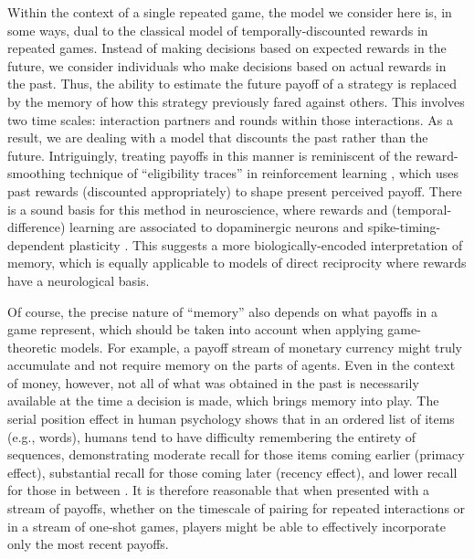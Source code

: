 \documentclass[11pt]{article}
\theoremstyle{plainCl1}
\theoremstyle{plainCl2}
\begin{document}
Within the context of a single repeated game, the model we consider here is, in some ways, dual to the classical model of temporally-discounted rewards in repeated games. Instead of making decisions based on expected rewards in the future, we consider individuals who make decisions based on actual rewards in the past. Thus, the ability to estimate the future payoff of a strategy is replaced by the memory of how this strategy previously fared against others. This involves two time scales: interaction partners and rounds within those interactions. As a result, we are dealing with a model that discounts the past rather than the future. Intriguingly, treating payoffs in this manner is reminiscent of the reward-smoothing technique of ``eligibility traces'' in reinforcement learning \citep{sutton:MIT:2018}, which uses past rewards (discounted appropriately) to shape present perceived payoff. There is a sound basis for this method in neuroscience, where rewards and (temporal-difference) learning are associated to dopaminergic neurons \citep{schultz:JN:1998} and spike-timing-dependent plasticity \citep{dan:Neuron:2004}. This suggests a more biologically-encoded interpretation of memory, which is equally applicable to models of direct reciprocity where rewards have a neurological basis.

Of course, the precise nature of ``memory'' also depends on what payoffs in a game represent, which should be taken into account when applying game-theoretic models. For example, a payoff stream of monetary currency might truly accumulate and not require memory on the parts of agents. Even in the context of money, however, not all of what was obtained in the past is necessarily available at the time a decision is made, which brings memory into play. The serial position effect in human psychology shows that in an ordered list of items (e.g., words), humans tend to have difficulty remembering the entirety of sequences, demonstrating moderate recall for those items coming earlier (primacy effect), substantial recall for those coming later (recency effect), and lower recall for those in between \citep{murdock:JEP:1962}. It is therefore reasonable that when presented with a stream of payoffs, whether on the timescale of pairing for repeated interactions or in a stream of one-shot games, players might be able to effectively incorporate only the most recent payoffs.
\end{document}
